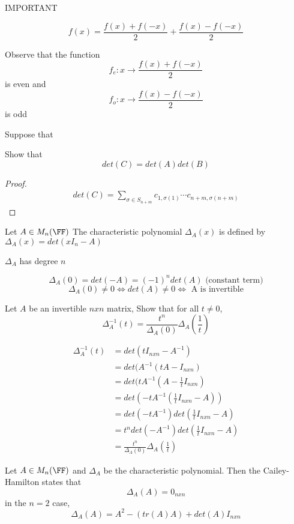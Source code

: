 \documentclass[11pt]{scrartcl}
\begin{document}
IMPORTANT 

\[
f(x) = \frac{f(x) + f(-x)}{2} + \frac{f(x) - f(-x)}{2}
\]

Observe that the function $$f_e: x \rightarrow  \frac{f(x) + f(-x)}{2}$$ is even and $$f_o: x \rightarrow  \frac{f(x) - f(-x)}{2}$$ is odd

Suppose that 

\begin{theorem}
	Show that 
	\[
	det(C) = det(A)det(B)
	\]
\end{theorem}

\begin{proof}
	\begin{align*}
		det(C) = \sum_{\sigma \in S_{n+m}} c_{1, \sigma(1)}\cdots c_{n+m, \sigma(n+m)}
	\end{align*}
\end{proof}

\begin{definition}
	Let $A \in M_n(\FF)$ The characteristic polynomial $\Delta_A (x)$ is defined by $\Delta_A(x) = det(xI_n - A)$
	
	$\Delta_A$ has degree $n$
	
	\[
	\Delta_A(0) = det(-A) = (-1)^ndet(A) \text{ (constant term)}
	\]
	\[
	\Delta_A(0) \neq 0 \iff det(A) \neq 0 \iff \text{ A is invertible}
	\]
\end{definition}
\begin{example}
Let $A$ be an invertible $nxn$ matrix, Show that for all $t \neq 0$, 
\[
\Delta_A^{-1} (t) = \frac{t^n}{\Delta_A(0)}\Delta_A(\frac{1}{t})
\]
\end{example}

\begin{soln}
\begin{align*}
	\Delta_A^{-1} (t) &= det(tI_{nxn} - A^{-1})\\
	&= det(A^{-1}(tA - I_{nxn})\\
	&= det(tA^{-1}(A - \frac{1}{t}I_{nxn})\\
	&= det(-tA^{-1}(\frac{1}{t}I_{nxn}-A))\\
	&= det(-tA^{-1})det(\frac{1}{t}I_{nxn}-A)\\
	&= t^ndet(-A^{-1})det(\frac{1}{t}I_{nxn}-A)\\
	&= \frac{t^n}{\Delta_A(0)}\Delta_A(\frac{1}{t})
\end{align*}
\end{soln}

\begin{theorem}
	Let $A \in M_n(\FF)$ and $\Delta_A$ be the characteristic polynomial. Then the Cailey-Hamilton states that
	\[
	\Delta_A(A) = 0_{nxn}
	\]
	in the $n=2$ case,
	\[
	\Delta_A(A) = A^2 - (tr(A)A) + det(A) I_{nxn}
	\]
\end{theorem}
\end{document}
